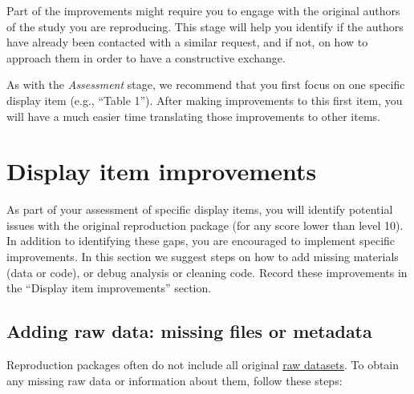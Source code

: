 \documentclass[]{book}
\begin{document}
Part of the improvements might require you to engage with the original authors of the study you are reproducing. This stage will help you identify if the authors have already been contacted with a similar request, and if not, on how to approach them in order to have a constructive exchange.

As with the \emph{Assessment} stage, we recommend that you first focus on one specific display item (e.g., ``Table 1''). After making improvements to this first item, you will have a much easier time translating those improvements to other items.

\hypertarget{di-imp}{%
\section{Display item improvements}\label{di-imp}}

As part of your assessment of specific display items, you will identify potential issues with the original reproduction package (for any score lower than level 10). In addition to identifying these gaps, you are encouraged to implement specific improvements. In this section we suggest steps on how to add missing materials (data or code), or debug analysis or cleaning code. Record these improvements in the ``Display item improvements'' section.

\hypertarget{rd}{%
\subsection{Adding raw data: missing files or metadata}\label{rd}}

Reproduction packages often do not include all original \protect\hyperlink{describe-inputs}{raw datasets}. To obtain any missing raw data or information about them, follow these steps:
\end{document}
